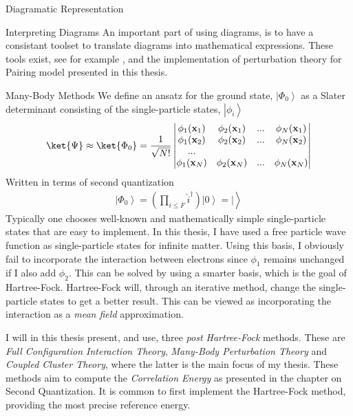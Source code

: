 \documentclass[twoside,english]{uiofysmaster}
\begin{document}
\begin{chapter}{Diagramatic Representation}
\begin{section}{Interpreting Diagrams}
		An important part of using diagrams, is to have a consistant toolset to translate diagrams into mathematical expressions. These tools exist, see for example \cite{ShavittAndBartlett}, and the implementation of perturbation theory for Pairing model presented in this thesis.  
	\end{section}

\end{chapter}



\begin{chapter}{Many-Body Methods}
	We define an ansatz for the ground state, $\left| \Phi_0 \right>$ as a Slater determinant consisting of the single-particle states, $\left| \phi_i \right>$
	\begin{align}
		\ket{\Psi} \approx \ket{\Phi_0} = 	\frac{1}{ \sqrt{N!} } \left|\begin{matrix}
			\phi_1(\mathbf{x}_1) & \phi_2(\mathbf{x}_1) & ... & \phi_N(\mathbf{x}_1) \\
			\phi_1(\mathbf{x}_2) & \phi_2(\mathbf{x}_2) & ... & \phi_N(\mathbf{x}_2) \\
			... & & & \\
			\phi_1(\mathbf{x}_N) & \phi_2(\mathbf{x}_N) & ... & \phi_N(\mathbf{x}_N) 
		\end{matrix} \right|
	\end{align}
	Written in terms of second quantization
	\begin{align}
		\left| \Phi_0 \right> = \left( \prod_{i \leq F} \hat i^\dagger \right) \left| 0 \right> = |\left.  \right> 
	\end{align}
	Typically one chooses well-known and mathematically simple single-particle states that are easy to implement. In this thesis, I have used a free particle wave function as single-particle states for infinite matter. Using this basis, I obviously fail to incorporate the interaction between electrons since $\phi_1$ remains unchanged if I also add $\phi_2$. This can be solved by using a smarter basis, which is the goal of Hartree-Fock. Hartree-Fock will, through an iterative method, change the single-particle states to get a better result. This can be viewed as incorporating the interaction as a \textit{mean field} approximation. 

	I will in this thesis present, and use, three \textit{post Hartree-Fock} methods. These are \textit{Full Configuration Interaction Theory}, \textit{Many-Body Perturbation Theory} and \textit{Coupled Cluster Theory}, where the latter is the main focus of my thesis. These methods aim to compute the \textit{Correlation Energy} as presented in the chapter on Second Quantization. It is common to first implement the Hartree-Fock method, providing the most precise reference energy. 


\end{chapter}
\end{document}
